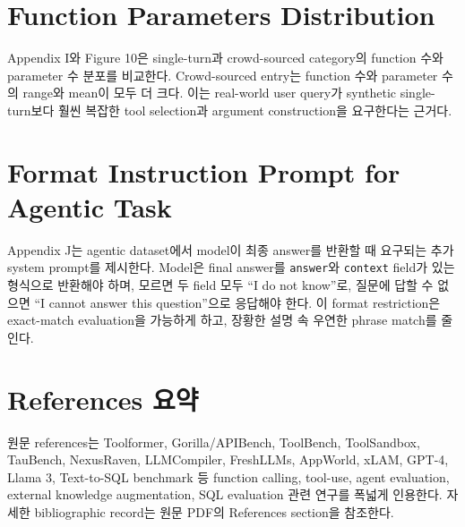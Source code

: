 \documentclass[11pt]{article}
\begin{document}
\section{Function Parameters Distribution}
Appendix I와 Figure 10은 single-turn과 crowd-sourced category의 function 수와 parameter 수 분포를 비교한다. Crowd-sourced entry는 function 수와 parameter 수의 range와 mean이 모두 더 크다. 이는 real-world user query가 synthetic single-turn보다 훨씬 복잡한 tool selection과 argument construction을 요구한다는 근거다.

\section{Format Instruction Prompt for Agentic Task}
Appendix J는 agentic dataset에서 model이 최종 answer를 반환할 때 요구되는 추가 system prompt를 제시한다. Model은 final answer를 \texttt{answer}와 \texttt{context} field가 있는 형식으로 반환해야 하며, 모르면 두 field 모두 ``I do not know''로, 질문에 답할 수 없으면 ``I cannot answer this question''으로 응답해야 한다. 이 format restriction은 exact-match evaluation을 가능하게 하고, 장황한 설명 속 우연한 phrase match를 줄인다.

\section*{References 요약}
원문 references는 Toolformer, Gorilla/APIBench, ToolBench, ToolSandbox, TauBench, NexusRaven, LLMCompiler, FreshLLMs, AppWorld, xLAM, GPT-4, Llama 3, Text-to-SQL benchmark 등 function calling, tool-use, agent evaluation, external knowledge augmentation, SQL evaluation 관련 연구를 폭넓게 인용한다. 자세한 bibliographic record는 원문 PDF의 References section을 참조한다.
\end{document}
